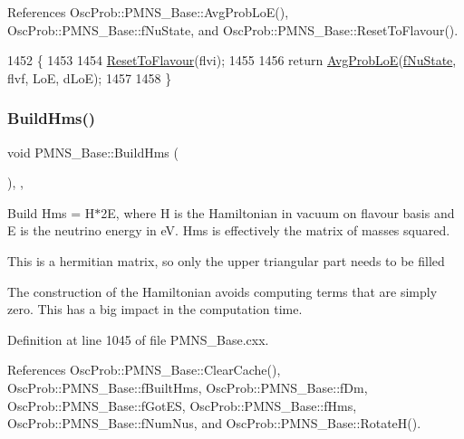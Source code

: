 References Osc\+Prob\+::\+P\+M\+N\+S\+\_\+\+Base\+::\+Avg\+Prob\+Lo\+E(), Osc\+Prob\+::\+P\+M\+N\+S\+\_\+\+Base\+::f\+Nu\+State, and Osc\+Prob\+::\+P\+M\+N\+S\+\_\+\+Base\+::\+Reset\+To\+Flavour().


\begin{DoxyCode}
1452 \{
1453 
1454   \hyperlink{classOscProb_1_1PMNS__Base_ac0d4bf8ff1318ef96d3dafa62e0cec25}{ResetToFlavour}(flvi);
1455 
1456   \textcolor{keywordflow}{return} \hyperlink{classOscProb_1_1PMNS__Base_a19f160c045a01e5083506e925fb37d44}{AvgProbLoE}(\hyperlink{classOscProb_1_1PMNS__Base_abf99f2339e3ee989600740b5d88063e8}{fNuState}, flvf, LoE, dLoE);
1457 
1458 \}
\end{DoxyCode}
\mbox{\label{classOscProb_1_1PMNS__Base_ad0faf5eae755afb1baa1fcd5ffebad41}} 
\subsubsection{\texorpdfstring{Build\+Hms()}{BuildHms()}}
{\footnotesize\ttfamily void P\+M\+N\+S\+\_\+\+Base\+::\+Build\+Hms (\begin{DoxyParamCaption}{ }\end{DoxyParamCaption})\hspace{0.3cm}{\ttfamily [protected]}, {\ttfamily [virtual]}, {\ttfamily [inherited]}}

Build Hms = H$\ast$2E, where H is the Hamiltonian in vacuum on flavour basis and E is the neutrino energy in eV. Hms is effectively the matrix of masses squared.

This is a hermitian matrix, so only the upper triangular part needs to be filled

The construction of the Hamiltonian avoids computing terms that are simply zero. This has a big impact in the computation time. 

Definition at line 1045 of file P\+M\+N\+S\+\_\+\+Base.\+cxx.



References Osc\+Prob\+::\+P\+M\+N\+S\+\_\+\+Base\+::\+Clear\+Cache(), Osc\+Prob\+::\+P\+M\+N\+S\+\_\+\+Base\+::f\+Built\+Hms, Osc\+Prob\+::\+P\+M\+N\+S\+\_\+\+Base\+::f\+Dm, Osc\+Prob\+::\+P\+M\+N\+S\+\_\+\+Base\+::f\+Got\+ES, Osc\+Prob\+::\+P\+M\+N\+S\+\_\+\+Base\+::f\+Hms, Osc\+Prob\+::\+P\+M\+N\+S\+\_\+\+Base\+::f\+Num\+Nus, and Osc\+Prob\+::\+P\+M\+N\+S\+\_\+\+Base\+::\+Rotate\+H().



